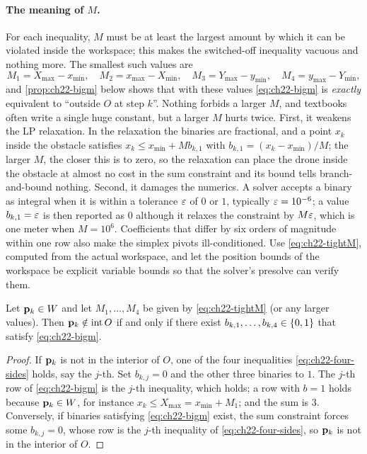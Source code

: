 \paragraph{The meaning of $M$.}
For each inequality, $M$ must be at least the largest amount by which it can
be violated inside the workspace; this makes the switched-off inequality
vacuous and nothing more. The smallest such values are
\begin{equation}
  M_1 = X_{\max} - x_{\min}, \quad
  M_2 = x_{\max} - X_{\min}, \quad
  M_3 = Y_{\max} - y_{\min}, \quad
  M_4 = y_{\max} - Y_{\min},
  \label{eq:ch22-tightM}
\end{equation}
and \cref{prop:ch22-bigm} below shows that with these values
\cref{eq:ch22-bigm} is \emph{exactly} equivalent to ``outside $O$ at step
$k$''. Nothing forbids a larger $M$, and textbooks often write a single
huge constant, but a larger $M$ hurts twice.
First, it weakens the LP relaxation. In the relaxation the binaries are
fractional, and a point $x_k$ inside the obstacle satisfies
$x_k \le x_{\min} + M b_{k,1}$ with $b_{k,1} = (x_k - x_{\min})/M$; the larger
$M$, the closer this is to zero, so the relaxation can place the drone inside
the obstacle at almost no cost in the sum constraint and its bound tells
branch-and-bound nothing. Second, it damages the numerics. A solver accepts
a binary as integral when it is within a tolerance $\varepsilon$ of $0$ or $1$,
typically $\varepsilon = 10^{-6}$; a value $b_{k,1} = \varepsilon$ is then reported as
$0$ although it relaxes the constraint by $M\varepsilon$, which is one meter when
$M = 10^{6}$. Coefficients that differ by six orders of magnitude within one
row also make the simplex pivots ill-conditioned. Use \cref{eq:ch22-tightM},
computed from the actual workspace, and let the position bounds of the
workspace be explicit variable bounds so that the solver's presolve can
verify them.

\begin{proposition}
\label{prop:ch22-bigm}
Let $\mathbf{p}_k \in W$ and let $M_1, \dots, M_4$ be given by \cref{eq:ch22-tightM}
(or any larger values). Then $\mathbf{p}_k \notin \operatorname{int} O$ if and
only if there exist $b_{k,1}, \dots, b_{k,4} \in \left\{ 0,1 \right\}$ that satisfy
\cref{eq:ch22-bigm}.
\end{proposition}
\begin{proof}
If $\mathbf{p}_k$ is not in the interior of $O$, one of the four inequalities
\cref{eq:ch22-four-sides} holds, say the $j$-th. Set $b_{k,j} = 0$ and the
other three binaries to $1$. The $j$-th row of \cref{eq:ch22-bigm} is the
$j$-th inequality, which holds; a row with $b = 1$ holds because $\mathbf{p}_k \in
W$, for instance $x_k \le X_{\max} = x_{\min} + M_1$; and the sum is $3$.
Conversely, if binaries satisfying \cref{eq:ch22-bigm} exist, the sum
constraint forces some $b_{k,j} = 0$, whose row is the $j$-th inequality of
\cref{eq:ch22-four-sides}, so $\mathbf{p}_k$ is not in the interior of $O$.
\end{proof}

